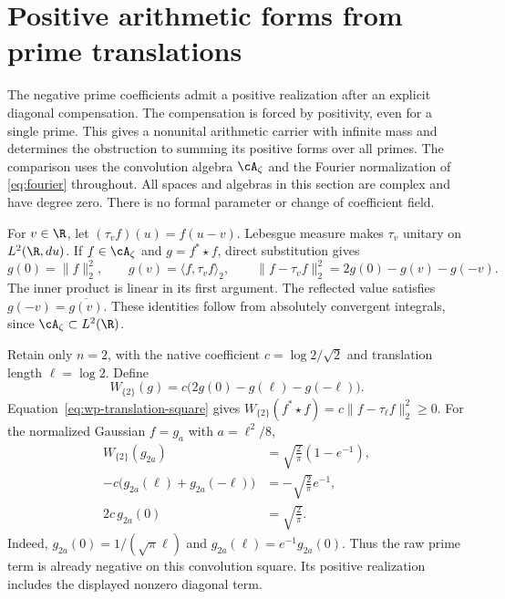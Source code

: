 \section{Positive arithmetic forms from prime translations}
\label{sec:wp-prime-translations}

The negative prime coefficients admit a positive realization after an
explicit diagonal compensation.
The compensation is forced by positivity, even for a single prime.
This gives a nonunital arithmetic carrier with infinite mass and determines
the obstruction to summing its positive forms over all primes.
The comparison uses the convolution algebra $\cA_\zeta$ and the Fourier
normalization of \eqref{eq:fourier} throughout.
All spaces and algebras in this section are complex and have degree zero.
There is no formal parameter or change of coefficient field.

For $v\in\R$, let $(\tau_v f)(u)=f(u-v)$.
Lebesgue measure makes $\tau_v$ unitary on $L^2(\R,du)$.
If $f\in\cA_\zeta$ and $g=f^*\star f$, direct substitution gives
\begin{equation}
 g(0)=\|f\|_2^2,\qquad
 g(v)=\langle f,\tau_v f\rangle_2,\qquad
 \|f-\tau_v f\|_2^2=2g(0)-g(v)-g(-v).
 \label{eq:wp-translation-square}
\end{equation}
The inner product is linear in its first argument.
The reflected value satisfies $g(-v)=\overline{g(v)}$.
These identities follow from absolutely convergent integrals, since
$\cA_\zeta\subset L^2(\R)$.

\begin{example}
\label{ex:wp-prime-two}
Retain only $n=2$, with the native coefficient
$c=\log 2/\sqrt 2$ and translation length $\ell=\log 2$.
Define
\[
 W_{\{2\}}(g)=c\bigl(2g(0)-g(\ell)-g(-\ell)\bigr).
\]
Equation~\eqref{eq:wp-translation-square} gives
$W_{\{2\}}(f^*\star f)=c\|f-\tau_\ell f\|_2^2\geq0$.
For the normalized Gaussian $f=g_a$ with $a=\ell^2/8$,
\begin{equation}
 \begin{aligned}
 W_{\{2\}}(g_{2a})&=\sqrt{\frac2\pi}(1-e^{-1}),\\
 -c\bigl(g_{2a}(\ell)+g_{2a}(-\ell)\bigr)
 &=-\sqrt{\frac2\pi}e^{-1},\\
 2c\,g_{2a}(0)&=\sqrt{\frac2\pi}.
 \end{aligned}
 \label{eq:wp-prime-two-values}
\end{equation}
Indeed, $g_{2a}(0)=1/(\sqrt\pi\ell)$ and
$g_{2a}(\ell)=e^{-1}g_{2a}(0)$.
Thus the raw prime term is already negative on this convolution square.
Its positive realization includes the displayed nonzero diagonal term.
\end{example}

